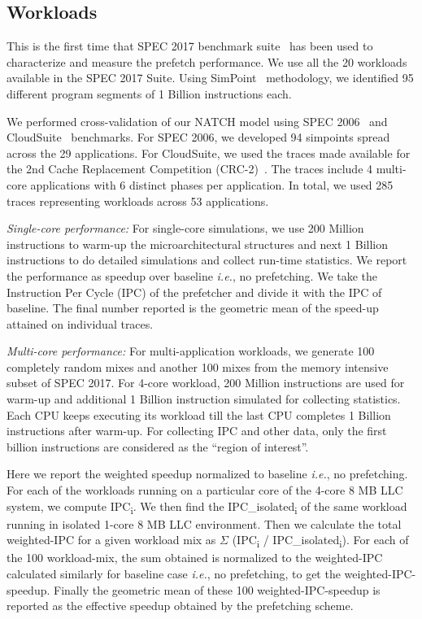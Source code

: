 \subsection{Workloads}
\label{Method-Workloads}
This is the first time that SPEC 2017 benchmark suite~\cite{SPEC2017}
has been used to characterize and measure the prefetch performance.
We use all the 20 workloads available in the SPEC 2017 Suite.  Using
SimPoint~\cite{SimPoint} methodology, we identified 95 different
program segments of 1 Billion instructions each.

We performed cross-validation of our NATCH model using SPEC
2006~\cite{SPEC2006} and CloudSuite~\cite{CloudSuite} benchmarks.  For
SPEC 2006, we developed 94 simpoints spread across the 29
applications.  For CloudSuite, we used the traces made available for
the 2nd Cache Replacement Competition (CRC-2)~\cite{CRC_2}.  The traces
include 4 multi-core applications with 6 distinct phases per
application.  In total, we used 285 traces representing workloads
across 53 applications.

\textit{Single-core performance:} For single-core simulations, we use
200 Million instructions to warm-up the microarchitectural structures
and next 1 Billion instructions to do detailed simulations and collect
run-time statistics.  We report the performance as speedup over
baseline \textit{i.e.}, no prefetching.  We take the Instruction Per
Cycle (IPC) of the prefetcher and divide it with the IPC of baseline.
The final number reported is the geometric mean of the speed-up
attained on individual traces.

\textit{Multi-core performance:} For multi-application workloads, we
generate 100 completely random mixes and another 100 mixes from the
memory intensive subset of SPEC 2017.  For 4-core workload, 200
Million instructions are used for warm-up and additional 1 Billion
instruction simulated for collecting statistics.  Each CPU keeps
executing its workload till the last CPU completes 1 Billion
instructions after warm-up.  For collecting IPC and other data, only
the first billion instructions are considered as the ``region of
interest''.

Here we report the weighted speedup normalized to baseline
\textit{i.e.}, no prefetching.  For each of the workloads running on a
particular core of the 4-core 8 MB LLC system, we compute
IPC\textsubscript{i}.  We then find the IPC\_isolated\textsubscript{i}
of the same workload running in isolated 1-core 8 MB LLC environment.
Then we calculate the total weighted-IPC for a given workload mix as
$\Sigma$ (IPC\textsubscript{i} / IPC\_isolated\textsubscript{i}).  For
each of the 100 workload-mix, the sum obtained is normalized to the
weighted-IPC calculated similarly for baseline case \textit{i.e.}, no
prefetching, to get the weighted-IPC-speedup.  Finally the geometric
mean of these 100 weighted-IPC-speedup is reported as the effective
speedup obtained by the prefetching scheme.


